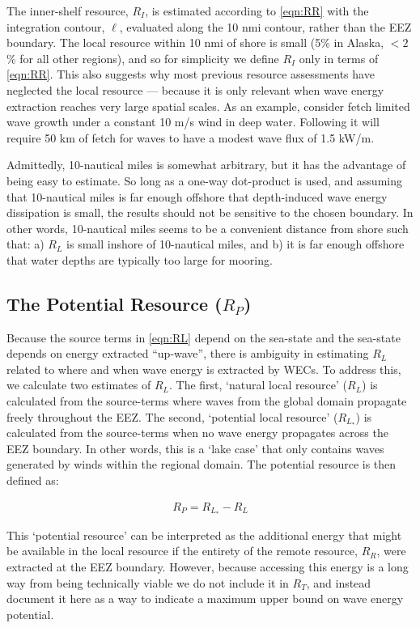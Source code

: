 The inner-shelf resource, $R_I$, is estimated according to \eqref{eqn:RR} with the integration contour, $\ell$, evaluated along the 10 nmi contour, rather than the EEZ boundary.  The local resource within 10 nmi of shore is small (5\% in Alaska, $<2$\% for all other regions), and so for simplicity we define $R_I$ only in terms of \eqref{eqn:RR}. 
This also suggests why most previous resource assessments have neglected the local resource — because it is only relevant when wave energy extraction reaches very large spatial scales. As an example, consider fetch limited wave growth under a constant 10 m/s wind in deep water. Following \citet{donelan1980similarity} it will require 50 km of fetch for waves to have a modest wave flux of 1.5 kW/m. 

Admittedly, 10-nautical miles is somewhat arbitrary, but it has the advantage of being easy to estimate. So long as a one-way dot-product is used, and assuming that 10-nautical miles is far enough offshore that depth-induced wave energy dissipation is small, the results should not be sensitive to the chosen boundary. In other words, 10-nautical miles seems to be a convenient distance from shore such that: a) $R_L$ is small inshore of 10-nautical miles, and b) it is far enough offshore that water depths are typically too large for mooring.

\subsection{The Potential Resource ($R_P$)}

Because the source terms in \eqref{eqn:RL} depend on the sea-state and the sea-state depends on energy extracted ``up-wave'', there is ambiguity in estimating $R_L$ related to where and when wave energy is extracted by WECs. To address this, we calculate two estimates of $R_L$. The first, `natural local resource' ($R_L$) is calculated from the source-terms where waves from the global domain propagate freely throughout the EEZ. The second, `potential local resource' ($R_{L_*}$) is calculated from the source-terms when no wave energy propagates across the EEZ boundary. In other words, this is a `lake case' that only contains waves generated by winds within the regional domain. The potential resource is then defined as:

\begin{align}
    R_P = R_{L_*} - R_L
\end{align}

This `potential resource' can be interpreted as the additional energy that might be available in the local resource if the entirety of the remote resource, $R_R$, were extracted at the EEZ boundary. However, because accessing this energy is a long way from being technically viable we do not include it in $R_T$, and instead document it here as a way to indicate a maximum upper bound on wave energy potential. 

